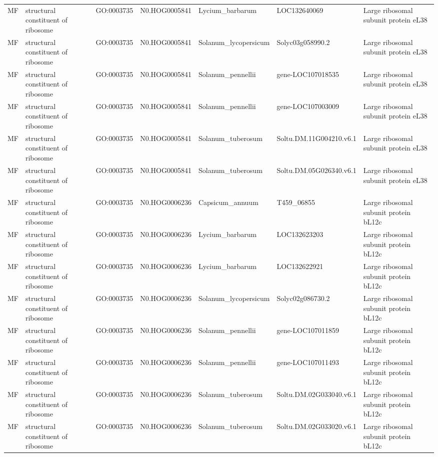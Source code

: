 \begin{table}
\begin{tabular}[t]{lllllll}
MF & structural constituent of ribosome & GO:0003735 & N0.HOG0005841 & Lycium\_barbarum & LOC132640069 & Large ribosomal subunit protein eL38\\
MF & structural constituent of ribosome & GO:0003735 & N0.HOG0005841 & Solanum\_lycopersicum & Solyc03g058990.2 & Large ribosomal subunit protein eL38\\
MF & structural constituent of ribosome & GO:0003735 & N0.HOG0005841 & Solanum\_pennellii & gene-LOC107018535 & Large ribosomal subunit protein eL38\\
MF & structural constituent of ribosome & GO:0003735 & N0.HOG0005841 & Solanum\_pennellii & gene-LOC107003009 & Large ribosomal subunit protein eL38\\
MF & structural constituent of ribosome & GO:0003735 & N0.HOG0005841 & Solanum\_tuberosum & Soltu.DM.11G004210.v6.1 & Large ribosomal subunit protein eL38\\
MF & structural constituent of ribosome & GO:0003735 & N0.HOG0005841 & Solanum\_tuberosum & Soltu.DM.05G026340.v6.1 & Large ribosomal subunit protein eL38\\
MF & structural constituent of ribosome & GO:0003735 & N0.HOG0006236 & Capsicum\_annuum & T459\_06855 & Large ribosomal subunit protein bL12c\\
MF & structural constituent of ribosome & GO:0003735 & N0.HOG0006236 & Lycium\_barbarum & LOC132623203 & Large ribosomal subunit protein bL12c\\
MF & structural constituent of ribosome & GO:0003735 & N0.HOG0006236 & Lycium\_barbarum & LOC132622921 & Large ribosomal subunit protein bL12c\\
MF & structural constituent of ribosome & GO:0003735 & N0.HOG0006236 & Solanum\_lycopersicum & Solyc02g086730.2 & Large ribosomal subunit protein bL12c\\
MF & structural constituent of ribosome & GO:0003735 & N0.HOG0006236 & Solanum\_pennellii & gene-LOC107011859 & Large ribosomal subunit protein bL12c\\
MF & structural constituent of ribosome & GO:0003735 & N0.HOG0006236 & Solanum\_pennellii & gene-LOC107011493 & Large ribosomal subunit protein bL12c\\
MF & structural constituent of ribosome & GO:0003735 & N0.HOG0006236 & Solanum\_tuberosum & Soltu.DM.02G033040.v6.1 & Large ribosomal subunit protein bL12c\\
MF & structural constituent of ribosome & GO:0003735 & N0.HOG0006236 & Solanum\_tuberosum & Soltu.DM.02G033020.v6.1 & Large ribosomal subunit protein bL12c\\

\end{tabular}
\end{table}
